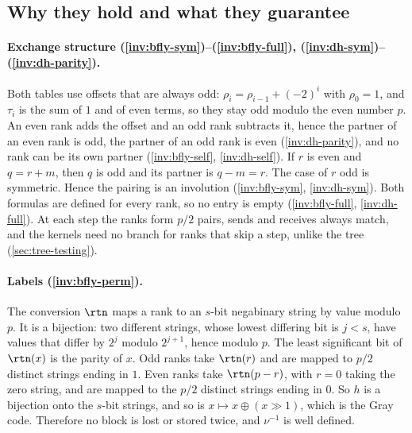 \subsection{Why they hold and what they guarantee}

\paragraph{Exchange structure (\ref{inv:bfly-sym})--(\ref{inv:bfly-full}), (\ref{inv:dh-sym})--(\ref{inv:dh-parity}).}
Both tables use offsets that are always odd: $\rho_i=\rho_{i-1}+(-2)^i$ with $\rho_0=1$, and $\tau_i$ is the sum of $1$ and of even terms, so they stay odd modulo the even number $p$.
An even rank adds the offset and an odd rank subtracts it, hence the partner of an even rank is odd, the partner of an odd rank is even (\ref{inv:dh-parity}), and no rank can be its own partner (\ref{inv:bfly-self}, \ref{inv:dh-self}).
If $r$ is even and $q=r+m$, then $q$ is odd and its partner is $q-m=r$. The case of $r$ odd is symmetric.
Hence the pairing is an involution (\ref{inv:bfly-sym}, \ref{inv:dh-sym}).
Both formulas are defined for every rank, so no entry is empty (\ref{inv:bfly-full}, \ref{inv:dh-full}).
At each step the ranks form $p/2$ pairs, sends and receives always match, and the kernels need no branch for ranks that skip a step, unlike the tree (\cref{sec:tree-testing}).

\paragraph{Labels (\ref{inv:bfly-perm}).}
The conversion $\rtn$ maps a rank to an $s$-bit negabinary string by value modulo $p$.
It is a bijection: two different strings, whose lowest differing bit is $j<s$, have values that differ by $2^j$ modulo $2^{j+1}$, hence modulo $p$.
The least significant bit of $\rtn(x)$ is the parity of $x$.
Odd ranks take $\rtn(r)$ and are mapped to $p/2$ distinct strings ending in $1$. Even ranks take $\rtn(p-r)$, with $r=0$ taking the zero string, and are mapped to the $p/2$ distinct strings ending in $0$.
So $h$ is a bijection onto the $s$-bit strings, and so is $x\mapsto x\oplus(x\gg1)$, which is the Gray code.
Therefore no block is lost or stored twice, and $\nu^{-1}$ is well defined.

